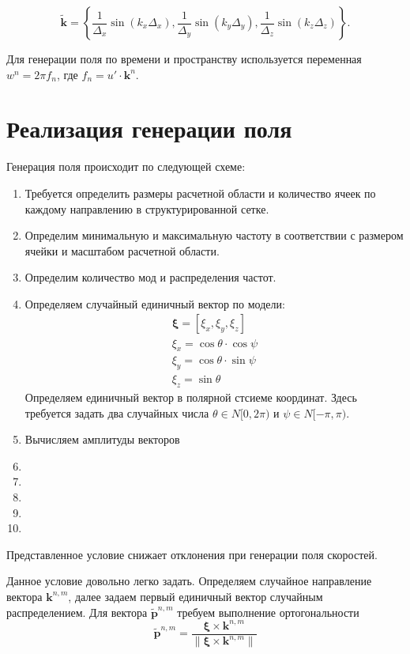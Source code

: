 \documentclass[12pt,a4paper]{article}
\begin{document}
\begin{equation} \label{eq_tilde_k_horder}
\boldsymbol{\tilde{k}} = \left\{ 
\frac{1}{\Delta_x} \sin{\left( k_x {\Delta_x}  \right)},
\frac{1}{\Delta_y} \sin{\left( k_y {\Delta_y}  \right)},
\frac{1}{\Delta_z} \sin{\left( k_z {\Delta_z}  \right)} \right\}.
\end{equation}

Для генерации поля по времени и пространству используется переменная $w^n = 2\pi f_n$, где $f_n = u' \cdot \boldsymbol{k}^n$. 

\section{Реализация генерации поля}
 Генерация поля происходит по следующей схеме:
\begin{enumerate}
\item Требуется определить размеры расчетной области и количество ячеек по каждому направлению в структурированной сетке.
\item Определим минимальную и максимальную частоту в соответствии с размером ячейки и масштабом расчетной области.
\item Определим количество мод и распределения частот.
\item Определяем случайный единичный вектор по модели:
	\begin{eqnarray}
	\boldsymbol{\xi} = \left[\xi_x, \xi_y, \xi_z\right] \\
	\xi_x = \cos \theta \cdot \cos \psi \nonumber\\ 
	\xi_y = \cos \theta \cdot \sin \psi  \nonumber\\ 
	\xi_z = \sin \theta \nonumber
	\end{eqnarray} 
	Определяем единичный вектор в полярной стсиеме координат. Здесь требуется задать два случайных числа $\theta \in N[0,2\pi)$ и $\psi \in N[-\pi,\pi)$.
\item Вычисляем амплитуды векторов 
\item 
\item 
\item 
\item 
\item 
\end{enumerate}
Представленное условие снижает отклонения при генерации поля скоростей. 



Данное условие довольно легко задать. Определяем случайное направление вектора $\boldsymbol{k}^{n,m}$, далее задаем первый единичный вектор случайным распределением. Для вектора $\boldsymbol{\tilde{p}}^{n,m}$ требуем выполнение ортогональности 
\begin{equation}
 	\boldsymbol{\tilde{p}}^{n,m} = \frac{\boldsymbol{\xi} \times \boldsymbol{k}^{n,m} }{\left\|\boldsymbol{\xi} \times \boldsymbol{k}^{n,m} \right\|}
\end{equation}
\end{document}
